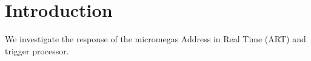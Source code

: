 \section{Introduction}
\label{sec:intro}

We investigate the response of the micromegas Address in Real Time (ART) and trigger processor.


